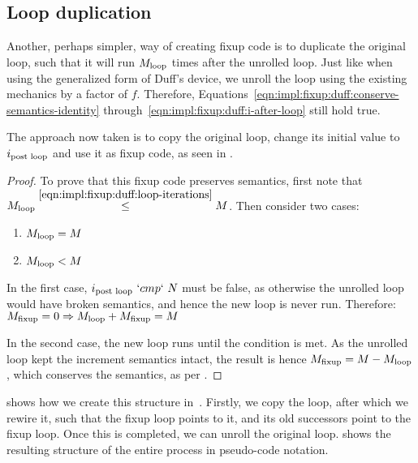 







\subsection{Loop duplication}\label{sec:impl:fixup:loop}

Another, perhaps simpler, way of creating fixup code is to duplicate the original loop, such that it will run $M_{\text{loop}}$ times after the unrolled loop.
Just like when using the generalized form of Duff's device, we unroll the loop using the existing mechanics by a factor of $f$.
Therefore, Equations~\ref{eqn:impl:fixup:duff:conserve-semantics-identity} through~\ref{eqn:impl:fixup:duff:i-after-loop} still hold true.

The approach now taken is to copy the original loop, change its initial value to $i_\text{post loop}$ and use it as fixup code, as seen in .



\begin{proof}
    To prove that this fixup code preserves semantics, first note that $M_{\text{loop}} \overset{\ref{eqn:impl:fixup:duff:loop-iterations}}{\leq} M$.
    Then consider two cases:
    \begin{enumerate}
        \item $M_{\text{loop}} = M$
        \item $M_{\text{loop}} < M$
    \end{enumerate}
    In the first case, $i_\text{post loop}~`cmp`~N$ must be false, as otherwise the unrolled loop would have broken semantics, and hence the new loop is never run.
    Therefore: $M_{\text{fixup}} = 0 \Rightarrow M_{\text{loop}} + M_{\text{fixup}} = M$

    In the second case, the new loop runs until the condition is met.
    As the unrolled loop kept the increment semantics intact, the result is hence $M_{\text{fixup}} = M - M_{\text{loop}}$, which conserves the semantics, as per .
\end{proof}

 shows how we create this structure in~\libFIRM.
Firstly, we copy the loop, after which we rewire it, such that the fixup loop points to it, and its old successors point to the fixup loop.
Once this is completed, we can unroll the original loop.
 shows the resulting structure of the entire process in pseudo-code notation.

